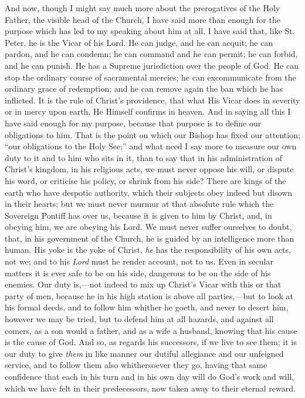 And now, though I might say much more about the
prerogatives of the Holy Father, the visible head of the
Church, I have said more than enough for the purpose
which has led to my speaking about him at all. I have said that, like St. Peter, he is the Vicar of his Lord.
He can judge, and he can acquit; he can pardon, and he
can condemn; he can command and he can permit; he can
forbid, and he can punish. He has a Supreme jurisdiction
over the people of God. He can stop the ordinary course
of sacramental mercies; he can excommunicate from the
ordinary grace of redemption; and he can remove again the
ban which he has inflicted. It is the rule of Christ's
providence, that what His Vicar does in severity or in
mercy upon earth, He Himself confirms in heaven. And in
saying all this I have said enough for my purpose,
because that purpose is to define our obligations to him.
That is the point on which our Bishop has fixed our
attention; ``our obligations to the Holy See;''
and what need I say more to measure our own duty to it
and to him who sits in it, than to say that in his
administration of Christ's kingdom, in his religious
acts, we must never oppose his will, or dispute his word,
or criticise his policy, or shrink from his side? There
are kings of the earth who have despotic authority, which
their subjects obey indeed but disown in their hearts;
but we must never murmur at that absolute rule which the
Sovereign Pontiff has over us, because it is given to him
by Christ, and, in obeying him, we are obeying his Lord.
We must never suffer ourselves to doubt, that, in his
government of the Church, he is guided by an intelligence
more than human. His yoke is the yoke of Christ, \emph{he}
has the responsibility of his own acts, not we; and to
his \emph{Lord} must he render account, not to us. Even
in secular matters it is ever safe to be on his side,
dangerous to be on the side of his enemies. Our duty
is,—not indeed to mix up Christ's Vicar with this or
that party of men, because he in his high station is
above all parties,—but to look at his formal deeds,
and to follow him whither he goeth, and never to desert
him, however we may be tried, but to defend him at all
hazards, and against all comers, as a son would a father,
and as a wife a husband, knowing that his cause is the
cause of God. And so, as regards his successors, if we
live to see them; it is our duty to give \emph{them} in like
manner our dutiful allegiance and our unfeigned service,
and to follow them also whithersoever they go, having
that same confidence that each in his turn and in his own
day will do God's work and will, which we have felt in
their predecessors, now taken away to their eternal
reward.

